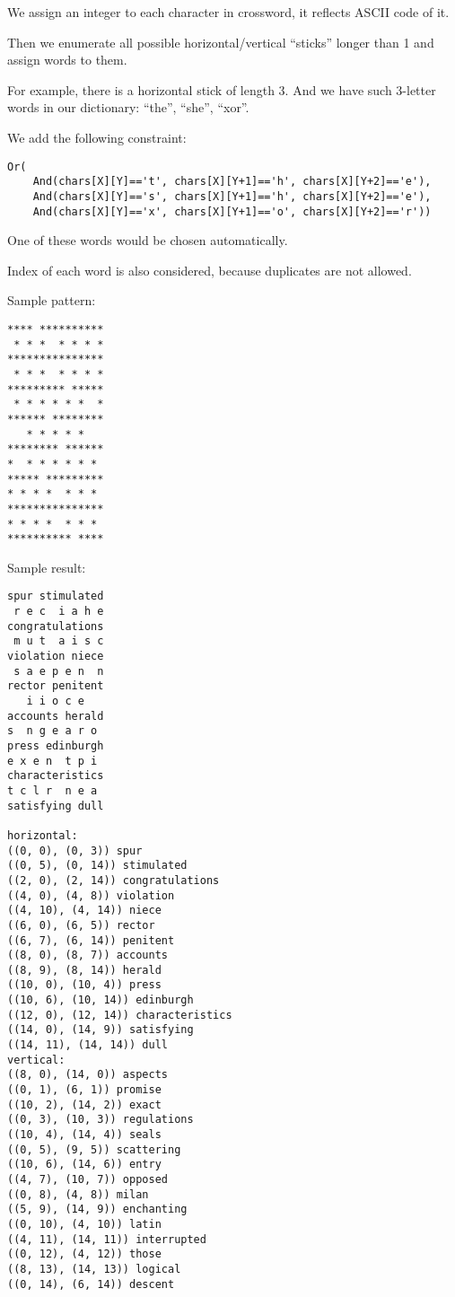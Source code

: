 
\renewcommand{\CURPATH}{puzzles/cross}

We assign an integer to each character in crossword, it reflects ASCII code of it.

Then we enumerate all possible horizontal/vertical ``sticks'' longer than 1 and assign words to them.

For example, there is a horizontal stick of length 3.
And we have such 3-letter words in our dictionary: ``the'', ``she'', ``xor''.

We add the following constraint:

\begin{lstlisting}
Or(
	And(chars[X][Y]=='t', chars[X][Y+1]=='h', chars[X][Y+2]=='e'),
	And(chars[X][Y]=='s', chars[X][Y+1]=='h', chars[X][Y+2]=='e'),
	And(chars[X][Y]=='x', chars[X][Y+1]=='o', chars[X][Y+2]=='r'))
\end{lstlisting}

One of these words would be chosen automatically.

Index of each word is also considered, because duplicates are not allowed.

Sample pattern:

\begin{lstlisting}
**** **********
 * * *  * * * *
***************
 * * *  * * * *
********* *****
 * * * * * *  *
****** ********
   * * * * *   
******** ******
*  * * * * * * 
***** *********
* * * *  * * * 
***************
* * * *  * * * 
********** ****
\end{lstlisting}

Sample result:

\begin{lstlisting}
spur stimulated
 r e c  i a h e
congratulations
 m u t  a i s c
violation niece
 s a e p e n  n
rector penitent
   i i o c e
accounts herald
s  n g e a r o
press edinburgh
e x e n  t p i
characteristics
t c l r  n e a
satisfying dull

horizontal:
((0, 0), (0, 3)) spur
((0, 5), (0, 14)) stimulated
((2, 0), (2, 14)) congratulations
((4, 0), (4, 8)) violation
((4, 10), (4, 14)) niece
((6, 0), (6, 5)) rector
((6, 7), (6, 14)) penitent
((8, 0), (8, 7)) accounts
((8, 9), (8, 14)) herald
((10, 0), (10, 4)) press
((10, 6), (10, 14)) edinburgh
((12, 0), (12, 14)) characteristics
((14, 0), (14, 9)) satisfying
((14, 11), (14, 14)) dull
vertical:
((8, 0), (14, 0)) aspects
((0, 1), (6, 1)) promise
((10, 2), (14, 2)) exact
((0, 3), (10, 3)) regulations
((10, 4), (14, 4)) seals
((0, 5), (9, 5)) scattering
((10, 6), (14, 6)) entry
((4, 7), (10, 7)) opposed
((0, 8), (4, 8)) milan
((5, 9), (14, 9)) enchanting
((0, 10), (4, 10)) latin
((4, 11), (14, 11)) interrupted
((0, 12), (4, 12)) those
((8, 13), (14, 13)) logical
((0, 14), (6, 14)) descent
\end{lstlisting}

